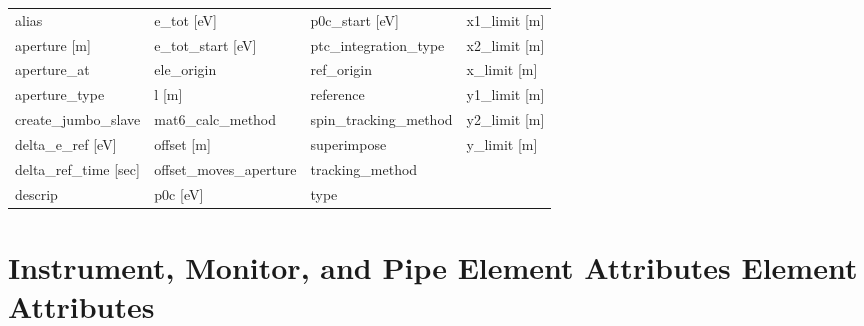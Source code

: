  \begin{tabular}{llll} \toprule
alias                          & e_tot [eV]                     & p0c_start [eV]                 & x1_limit [m]                   \\
aperture [m]                   & e_tot_start [eV]               & ptc_integration_type           & x2_limit [m]                   \\
aperture_at                    & ele_origin                     & ref_origin                     & x_limit [m]                    \\
aperture_type                  & l [m]                          & reference                      & y1_limit [m]                   \\
create_jumbo_slave             & mat6_calc_method               & spin_tracking_method           & y2_limit [m]                   \\
delta_e_ref [eV]               & offset [m]                     & superimpose                    & y_limit [m]                    \\
delta_ref_time [sec]           & offset_moves_aperture          & tracking_method                &                                \\
descrip                        & p0c [eV]                       & type                           &                                \\
 \bottomrule
 \end{tabular}
 \vfill
 
 \section{Instrument, Monitor, and Pipe Element Attributes Element Attributes}
 \label{s:list.instrument}
 
